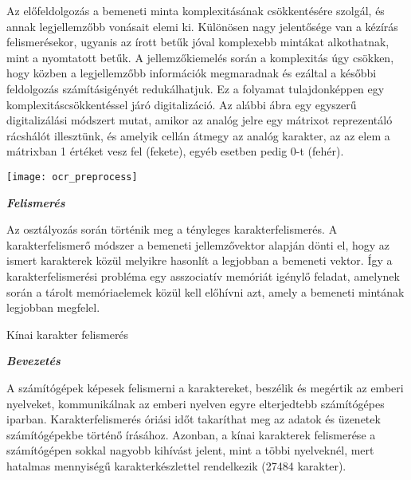 Az előfeldolgozás a bemeneti minta komplexitásának csökkentésére szolgál, és annak legjellemzőbb vonásait elemi ki. Különösen nagy jelentősége van a kézírás felismerésekor, ugyanis az írott betűk jóval komplexebb mintákat alkothatnak, mint a nyomtatott betűk. A jellemzőkiemelés során a komplexitás úgy csökken, hogy közben a legjellemzőbb információk megmaradnak és ezáltal a későbbi feldolgozás számításigényét redukálhatjuk. Ez a folyamat tulajdonképpen egy komplexitáscsökkentéssel járó digitalizáció. Az alábbi ábra egy egyszerű digitalizálási módszert mutat, amikor az analóg jelre egy mátrixot reprezentáló rácshálót illesztünk, és amelyik cellán átmegy az analóg karakter, az az elem a mátrixban 1 értéket vesz fel (fekete), egyéb esetben pedig 0-t (fehér).\\

\begin{center}
\texttt{[image: ocr\_preprocess]}
\end{center}

\begin{flushleft}
\textit{\textbf{{\large Felismerés\\}}}
\end{flushleft}

Az osztályozás során történik meg a tényleges karakterfelismerés. A karakterfelismerő módszer a bemeneti jellemzővektor alapján dönti el, hogy az ismert karakterek közül melyikre hasonlít a legjobban a bemeneti vektor. Így a karakterfelismerési probléma egy asszociatív memóriát igénylő feladat, amelynek során a tárolt memóriaelemek közül kell előhívni azt, amely a bemeneti mintának legjobban megfelel.\\

\begin{flushleft}
{\Large Kínai karakter felismerés}
\end{flushleft}

\begin{flushleft}
\textit{\textbf{{\large Bevezetés}}}
\end{flushleft}

A számítógépek képesek felismerni a karaktereket, beszélik és megértik az emberi nyelveket, kommunikálnak az emberi nyelven egyre elterjedtebb számítógépes iparban. Karakterfelismerés óriási időt takaríthat meg az adatok és üzenetek számítógépekbe történő írásához. Azonban, a kínai karakterek felismerése a számítógépen sokkal nagyobb kihívást jelent, mint a többi nyelveknél, mert hatalmas mennyiségű karakterkészlettel rendelkezik (27484 karakter).\\

